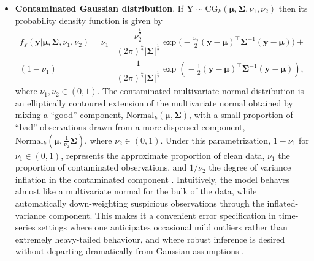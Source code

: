 \begin{itemize}
\item {\bf Contaminated Gaussian distribution}. If $\bm{Y}\sim\text{CG}_k(\bm{\mu},\bm{\Sigma},\nu_1,\nu_2)$ then its probability density function is given by \citep{Tukey60,PT21}
\begin{align*}
f_{Y}(\bm{y}|\bm{\mu},\bm{\Sigma},\nu_1,\nu_2)=\nu_1&\dfrac{\nu_2^{\frac{k}{2}}}{(2\pi)^{\frac{k}{2}}|\bm{\Sigma}|^{\frac{1}{2}}}\exp\!\bigg(\!\!-\!\frac{\nu_2}{2}(\bm{y}-\bm{\mu})^{\!\top}\bm{\Sigma}^{-1}(\bm{y}-\bm{\mu})\!\bigg) +\\ (1-\nu_1)&\dfrac{1}{(2\pi)^{\frac{k}{2}}|\bm{\Sigma}|^{\frac{1}{2}}}\exp\!\left(\!-\frac{1}{2}(\bm{y}-\bm{\mu})^{\!\top}\bm{\Sigma}^{-1}(\bm{y}-\bm{\mu})\!\right),
\end{align*}
where $\nu_1,\nu_2\in (0,1)$. The contaminated multivariate normal distribution is an elliptically contoured extension of the multivariate normal obtained by mixing a ``good'' component, $\text{Normal}_k(\bm{\mu},\bm{\Sigma})$, with a small proportion of ``bad'' observations drawn from a more dispersed component, $\text{Normal}_k(\bm{\mu},\frac{1}{\nu_2}\bm{\Sigma})$, where $\nu_2\in (0,1)$. Under this parametrization, $1-\nu_1$ for $\nu_1\in (0,1)$, represents the approximate proportion of clean data, $\nu_1$ the proportion of contaminated observations, and $1/\nu_2$ the degree of variance inflation in the contaminated component \citep{Tukey60, PT21}. Intuitively, the model behaves almost like a multivariate normal for the bulk of the data, while automatically down-weighting suspicious observations through the inflated-variance component. This makes it a convenient error specification in time-series settings where one anticipates occasional mild outliers rather than extremely heavy-tailed behaviour, and where robust inference is desired without departing dramatically from Gaussian assumptions
\citep{WangEtAl2009RobustTS,ABANTOVALLE2011,AbantoValle2012,PT21}.


\end{itemize}
